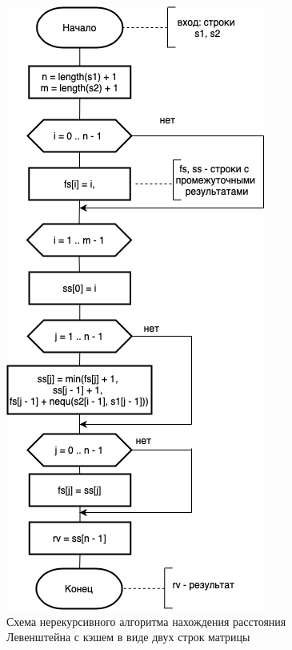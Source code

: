 \documentclass{report}
\begin{document}
\begin{figure}[h!p]\label{lev}
	\centering
	\includegraphics[scale = 0.7]{lev.drawio.png}
	\caption{Схема нерекурсивного алгоритма нахождения расстояния Левенштейна с кэшем в виде двух строк матрицы}
	\label{fig:mpr2}
\end{figure}
\end{document}
